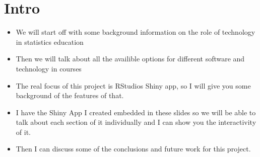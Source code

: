 \documentclass[11pt]{article}
\begin{document}
\section{Intro}
\begin{itemize}
\item We will start off with some background information on the role of technology in statistics education
\item Then we will talk about all the availible options for different software and technology in courses
\item The real focus of this project is RStudios Shiny app, so I will give you some background of the features of that.
\item I have the Shiny App I created embedded in these slides so we will be able to talk about each section of it individually and I can show you the interactivity of it.
\item Then I can discuss some of the conclusions and future work for this project. 
\end{itemize}
\end{document}

